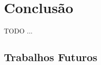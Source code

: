 \chapter{Conclusão}
\label{cha:conclusion}

TODO ...

\section{Trabalhos Futuros}
\label{sec:future_work}
